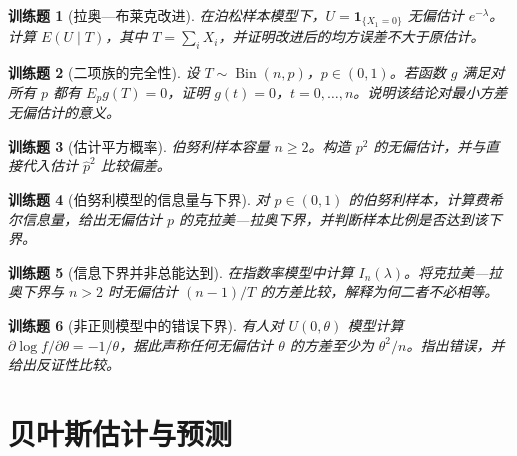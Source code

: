 \documentclass[UTF8,12pt,a4paper,fontset=fandol]{ctexbook}
\newtheorem{exercise}{训练题}[section]
\begin{document}
\begin{exercise}[拉奥—布莱克改进]\label{q:B11.3}
在泊松样本模型下，$U=\mathbf1_{\{X_1=0\}}$ 无偏估计 $e^{-\lambda}$。计算 $E(U\mid T)$，其中 $T=\sum_iX_i$，并证明改进后的均方误差不大于原估计。\par{}\end{exercise}

\begin{exercise}[二项族的完全性]\label{q:B11.4}
设 $T\sim\operatorname{Bin}(n,p)$，$p\in(0,1)$。若函数 $g$ 满足对所有 $p$ 都有 $E_pg(T)=0$，证明 $g(t)=0$，$t=0,\ldots,n$。说明该结论对最小方差无偏估计的意义。\par{}\end{exercise}

\begin{exercise}[估计平方概率]\label{q:B11.5}
伯努利样本容量 $n\ge2$。构造 $p^2$ 的无偏估计，并与直接代入估计 $\widehat p^2$ 比较偏差。\par{}\end{exercise}

\begin{exercise}[伯努利模型的信息量与下界]\label{q:B11.6}
对 $p\in(0,1)$ 的伯努利样本，计算费希尔信息量，给出无偏估计 $p$ 的克拉美—拉奥下界，并判断样本比例是否达到该下界。\par{}\end{exercise}

\begin{exercise}[信息下界并非总能达到]\label{q:B11.7}
在指数率模型中计算 $I_n(\lambda)$。将克拉美—拉奥下界与 $n>2$ 时无偏估计 $(n-1)/T$ 的方差比较，解释为何二者不必相等。\par{}\end{exercise}

\begin{exercise}[非正则模型中的错误下界]\label{q:B11.8}
有人对 $U(0,\theta)$ 模型计算 $\partial\log f/\partial\theta=-1/\theta$，据此声称任何无偏估计 $\theta$ 的方差至少为 $\theta^2/n$。指出错误，并给出反证性比较。\par{}\end{exercise}

\clearpage\section{贝叶斯估计与预测}
\end{document}
